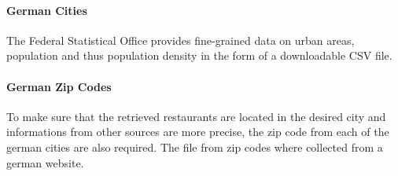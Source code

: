 \paragraph{German Cities}
The Federal Statistical Office provides fine-grained data on urban areas, population and thus population density in the form of a downloadable \ac{CSV} file.\cite{destatis}
\paragraph{German Zip Codes}
To make sure that the retrieved \ylp{} restaurants are located in the desired city and informations from other sources are more precise, the zip code from each of the german cities are also required. The file from zip codes where collected from a german website.\cite{plz}
